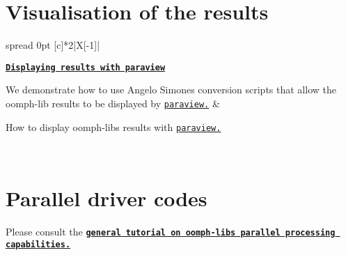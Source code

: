 \label{_visualisation}%
\section*{Visualisation of the results}

\tabulinesep=1mm
\begin{longtabu} spread 0pt [c]{*{2}{|X[-1]}|}
\hline
{}\\


\href{../../paraview/html/index.html}{\tt {\bfseries  Displaying results with paraview}}

We demonstrate how to use Angelo Simone\textquotesingle{}s conversion scripts that allow the {\ttfamily oomph-\/lib} results to be displayed by \href{http://www.paraview.org}{\tt paraview.}  &
\begin{DoxyItemize}
\item How to display {\ttfamily oomph-\/lib\textquotesingle{}s} results with \href{http://www.paraview.org}{\tt paraview.}
\end{DoxyItemize}

\\
\end{longtabu}


\label{_parallel}%
\section*{Parallel driver codes}

Please consult the \href{../../mpi/general_mpi/html/index.html}{\tt {\bfseries general tutorial on {\ttfamily oomph-\/lib}\textquotesingle{}s parallel processing capabilities.}}

